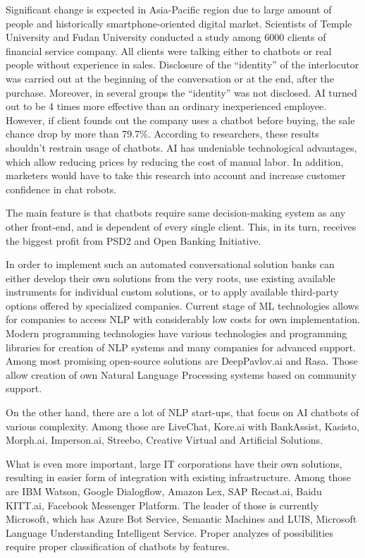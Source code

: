 Significant change is expected in Asia-Pacific region due to large amount of people and historically smartphone-oriented digital market.
Scientists of Temple University and Fudan University conducted a study among 6000 clients of financial service company.
All clients were talking either to chatbots or real people without experience in sales.
Disclosure of the “identity” of the interlocutor was carried out at the beginning of the conversation or at the end, 
after the purchase.
Moreover, in several groups the “identity” was not disclosed.
AI turned out to be 4 times more effective than an ordinary inexperienced employee. 
However, if client founds out the company uses a chatbot before buying, the sale chance drop by more than 79.7\%. 
According to researchers, these results shouldn't restrain usage of chatbots.
AI has undeniable technological advantages, which allow reducing prices by reducing the cost of manual labor.
In addition, marketers would have to take this research into account and increase customer confidence in chat robots. 

The main feature is that chatbots require same decision-making system as any other front-end, and is dependent of every single client.
This, in its turn, receives the biggest profit from PSD2 and Open Banking Initiative.

In order to implement such an automated conversational solution banks can either develop their own solutions from the very roots, use existing available instruments for individual custom solutions, or to apply available third-party options offered by specialized companies.
Current stage of ML technologies allows for companies to access NLP with considerably low costs for own implementation.
Modern programming technologies have various technologies and programming libraries for creation of NLP systems and many companies for advanced support.
Among most promising open-source solutions are DeepPavlov.ai and Rasa.
Those allow creation of own Natural Language Processing systems based on community support.

On the other hand, there are a lot of NLP start-ups, that focus on AI chatbots of various complexity.
Among those are LiveChat, Kore.ai with BankAssist, Kasisto, Morph.ai, Imperson.ai, Streebo, Creative Virtual and Artificial Solutions.

What is even more important, large IT corporations have their own solutions, resulting in easier form of integration with existing infrastructure.
Among those are IBM Watson, Google Dialogflow, Amazon Lex, SAP Recast.ai, Baidu KITT.ai, Facebook Messenger Platform.
The leader of those is currently Microsoft, which has Azure Bot Service, Semantic Machines and LUIS, Microsoft Language Understanding Intelligent Service.
Proper analyzes of possibilities require proper classification of chatbots by features.

